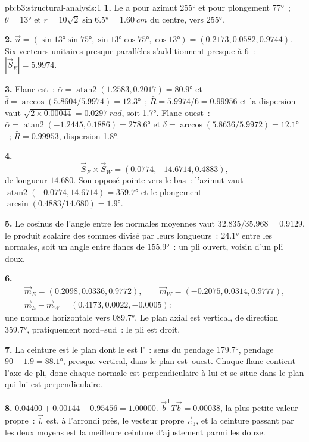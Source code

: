 \begin{solution}{pb:b3:structural-analysis:1}
\textbf{1.} Le  a pour azimut \ang{255} et pour plongement \ang{77}~; $\theta =
\ang{13}$ et $r = 10\sqrt2\sin\ang{6.5} = \qty{1.60}{cm}$ du centre,
vers \ang{255}.

\textbf{2.} $\vec n = (\sin\ang{13}\sin\ang{75}, \sin\ang{13}\cos\ang{75},
\cos\ang{13}) = (0.2173, 0.0582, 0.9744)$. Six vecteurs unitaires presque parallèles
s'additionnent presque à 6~: $|\vec S_E| = 5.9974$.

\textbf{3.} Flanc est~: $\bar\alpha = \operatorname{atan2}(1.2583, 0.2017) =
\ang{80.9}$ et $\bar\delta = \arccos(5.8604/5.9974) = \ang{12.3}$~; $\bar R
= 5.9974/6 = 0.99956$ et la dispersion vaut $\sqrt{2\times0.00044} =
\qty{0.0297}{rad}$, soit \ang{1.7}. Flanc ouest~: $\bar\alpha =
\operatorname{atan2}(-1.2445, 0.1886) = \ang{278.6}$ et $\bar\delta =
\arccos(5.8636/5.9972) = \ang{12.1}$~; $\bar R = 0.99953$, dispersion \ang{1.8}.

\textbf{4.}
\[
  \vec S_E\times\vec S_W = (0.0774, -14.6714, 0.4883),
\]
de longueur $14.680$. Son opposé pointe vers le bas~: l'azimut vaut $\operatorname{atan2}(-0.0774, 14.6714) = \ang{359.7}$ et le
plongement $\arcsin(0.4883/14.680) = \ang{1.9}$.

\textbf{5.} Le cosinus de l'angle entre les normales moyennes vaut
$32.835/35.968 = 0.9129$, le produit scalaire des sommes divisé par leurs
longueurs~: \ang{24.1} entre les normales, soit un angle entre flancs de \ang{155.9}~:
un pli ouvert, voisin d'un pli doux.

\textbf{6.}
\begin{gather*}
  \vec m_E = (0.2098, 0.0336, 0.9772),\qquad \vec m_W = (-0.2075, 0.0314, 0.9777),\\
  \vec m_E - \vec m_W = (0.4173, 0.0022, -0.0005):
\end{gather*}
une normale horizontale vers \ang{089.7}. Le plan axial est vertical, de direction
\ang{359.7}, pratiquement nord--sud~: le pli est droit.

\textbf{7.} La ceinture est le plan dont le  est l'~: sens du pendage
\ang{179.7}, pendage $90 - 1.9 = \ang{88.1}$, presque vertical, dans le
plan est--ouest. Chaque flanc contient l'axe de pli, donc chaque normale est perpendiculaire
à lui et se situe dans le plan qui lui est perpendiculaire.

\textbf{8.} $0.04400 + 0.00144 + 0.95456 = 1.00000$. $\vec b^{\mathsf T}T\vec
b = 0.00038$, la plus petite valeur propre~: $\vec b$ est, à l'arrondi près, le
vecteur propre $\vec e_3$, et la ceinture passant par les deux  moyens est la
meilleure ceinture d'ajustement parmi les douze.


\end{solution}
